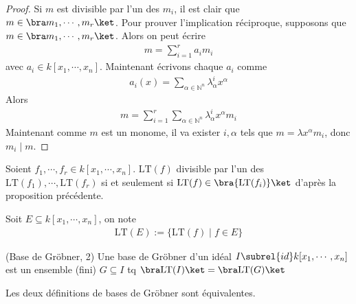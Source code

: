         \begin{proof}
            Si $m$ est divisible par l'un des $m_i$, il est clair que $m \in \bra m_1, \cdots, m_r \ket$. Pour prouver l'implication réciproque, supposons que $m \in \bra m_1, \cdots, m_r \ket$. Alors on peut écrire
            \begin{align*}
                m = \sum_{i = 1}^r a_i m_i
            \end{align*}
            avec $a_i \in k[x_1, \cdots, x_n]$. Maintenant écrivons chaque $a_i$ comme
            \begin{align*}
                a_i(x) = \sum_{\alpha \in \mathbb{N}^n} \lambda_\alpha^i x^{\alpha}
            \end{align*}
            Alors
            \begin{align*}
                m = \sum_{i = 1}^r \sum_{\alpha \in \mathbb{N}^n} \lambda_\alpha^i x^{\alpha} m_i
            \end{align*}
            Maintenant comme $m$ est un monome, il va exister $i, \alpha$ tels que $m = \lambda x^\alpha m_i$, donc $m_i \mid m$.
        \end{proof}
        Soient $f_1, \cdots, f_r \in k[x_1, \cdots, x_n]$. $\mathrm{LT}(f)$ divisible par l'un des $\mathrm{LT}(f_1), \cdots, \mathrm{LT}(f_r)$ si et seulement si $\mathrm{LT}(f) \in \bra \{\mathrm{LT}(f_i)\} \ket$ d'après la proposition précédente. \\
        \begin{nota}
            Soit $E \subseteq k[x_1, \cdots, x_n]$, on note
            \begin{align*}
                \mathrm{LT}(E) := \{\mathrm{LT}(f) \mid f \in E\}
            \end{align*}
        \end{nota}
        \begin{defi} (Base de Gröbner, 2)
            Une base de Gröbner d'un idéal $I \subrel{id} k[x_1, \cdots, x_n]$ est un ensemble (fini) $G \subseteq I$ tq $\bra \mathrm{LT}(I) \ket = \bra \mathrm{LT}(G) \ket$
        \end{defi}
        \begin{theo}
            Les deux définitions de bases de Gröbner sont équivalentes.
        \end{theo}
